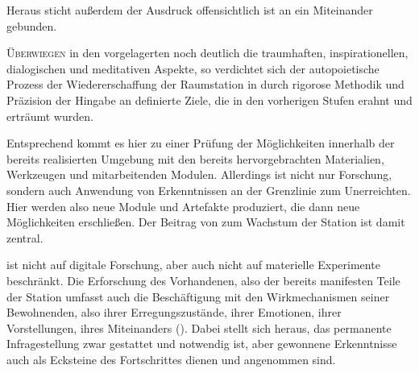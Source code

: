 Heraus sticht außerdem der Ausdruck   offensichtlich ist  an ein Miteinander gebunden.

\begin{newstuff}
    \lettrine{Ü}{berwiegen} in den vorgelagerten  noch deutlich die traumhaften, inspirationellen, dialogischen und meditativen Aspekte, so verdichtet sich der autopoietische Prozess der Wiedererschaffung der Raumstation in  durch rigorose Methodik und Präzision der Hingabe an definierte Ziele, die in den vorherigen Stufen erahnt und erträumt wurden.

    Entsprechend kommt es hier zu einer Prüfung der Möglichkeiten innerhalb der bereits realisierten Umgebung mit den bereits hervorgebrachten Materialien, Werkzeugen und mitarbeitenden Modulen. Allerdings ist  nicht nur Forschung, sondern auch Anwendung von Erkenntnissen an der Grenzlinie zum Unerreichten. Hier werden also neue Module und Artefakte produziert, die dann neue Möglichkeiten erschließen. Der Beitrag von  zum Wachstum der Station ist damit zentral.


     ist nicht auf digitale Forschung, aber auch nicht auf materielle Experimente beschränkt. Die Erforschung des Vorhandenen, also der bereits manifesten Teile der Station umfasst auch die Beschäftigung mit den Wirkmechanismen seiner Bewohnenden, also ihrer Erregungszustände, ihrer Emotionen, ihrer Vorstellungen, ihres Miteinanders (). Dabei stellt sich heraus, das permanente Infragestellung zwar gestattet und notwendig ist, aber gewonnene Erkenntnisse auch als Ecksteine des Fortschrittes dienen und angenommen sind.


\end{newstuff}
